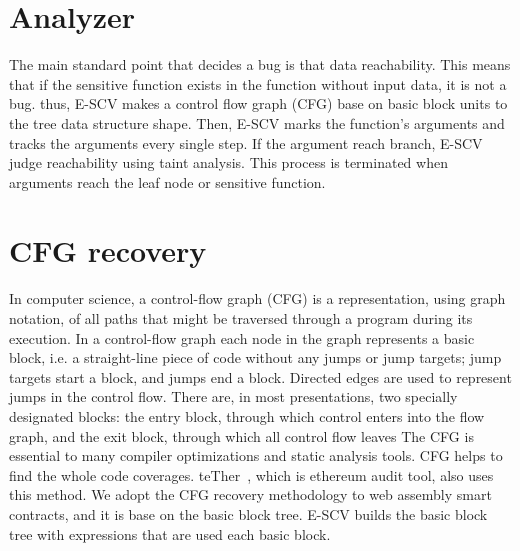 \section{Analyzer}
The main standard point that decides a bug is that data reachability. This means that if the sensitive function exists in the function without input data, it is not a bug. thus, E-SCV makes a control flow graph (CFG) base on basic block units to the tree data structure shape. Then, E-SCV marks the function's arguments and tracks the arguments every single step. If the argument reach branch, E-SCV judge reachability using taint analysis. This process is terminated when arguments reach the leaf node or sensitive function.  

\section{CFG recovery}
In computer science, a control-flow graph (CFG) is a representation, using graph notation, of all paths that might be traversed through a program during its execution.
In a control-flow graph each node in the graph represents a basic block, i.e. a straight-line piece of code without any jumps or jump targets; jump targets start a block, and jumps end a block. Directed edges are used to represent jumps in the control flow. There are, in most presentations, two specially designated blocks: the entry block, through which control enters into the flow graph, and the exit block, through which all control flow leaves
 The CFG is essential to many compiler optimizations and static analysis tools. CFG helps to find the whole code coverages. teTher~\cite{krupp2018teether}, which is ethereum audit tool, also uses this method. We adopt the CFG recovery methodology to web assembly smart contracts, and it is base on the basic block tree. E-SCV builds the basic block tree with expressions that are used each basic block.

